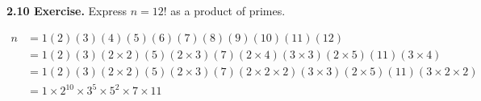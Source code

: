 \documentclass[12pt]{article}
\begin{document}
\noindent\textbf{2.10 Exercise.} Express $n=12!$ as a product of primes.

\begin{align*}
n &= 1 (2)(3)(4)(5)(6)(7)(8)(9)(10)(11)(12) \\
&= 1 (2)(3)(2 \times 2)(5)(2 \times 3)(7)(2 \times 4)(3 \times 3)(2 \times 5)(11)(3 \times 4) \\
&= 1 (2)(3)(2 \times 2)(5)(2 \times 3)(7)(2 \times 2 \times 2)(3 \times 3)(2 \times 5)(11)(3 \times 2 \times 2)\\
&= 1 \times 2^{10} \times 3^5 \times 5^2 \times 7 \times 11
\end{align*}
\end{document}
